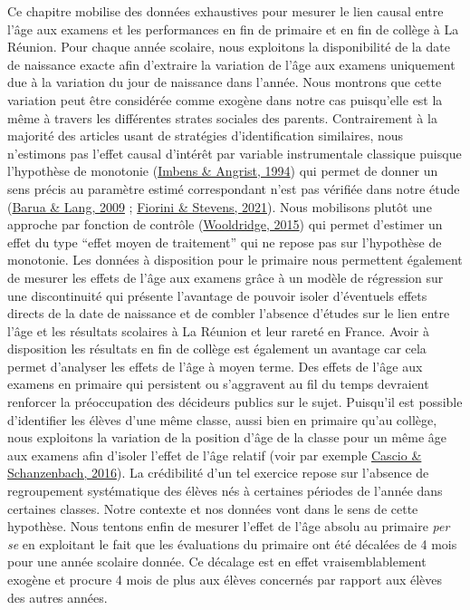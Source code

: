 \documentclass[
]{book}
\begin{document}
\quad Ce chapitre mobilise des données exhaustives pour mesurer le lien causal entre l'âge aux examens et les performances en fin de primaire et en fin de collège à La Réunion. Pour chaque année scolaire, nous exploitons la disponibilité de la date de naissance exacte afin d'extraire la variation de l'âge aux examens uniquement due à la variation du jour de naissance dans l'année. Nous montrons que cette variation peut être considérée comme exogène dans notre cas puisqu'elle est la même à travers les différentes strates sociales des parents. Contrairement à la majorité des articles usant de stratégies d'identification similaires, nous n'estimons pas l'effet causal d'intérêt par variable instrumentale classique puisque l'hypothèse de monotonie (\protect\hyperlink{ref-IMB:ANG:94}{Imbens \& Angrist, 1994}) qui permet de donner un sens précis au paramètre estimé correspondant n'est pas vérifiée dans notre étude (\protect\hyperlink{ref-BAR:LAN:09}{Barua \& Lang, 2009} ; \protect\hyperlink{ref-FIO:STE:21}{Fiorini \& Stevens, 2021}). Nous mobilisons plutôt une approche par fonction de contrôle (\protect\hyperlink{ref-WOO:15}{Wooldridge, 2015}) qui permet d'estimer un effet du type ``effet moyen de traitement'' qui ne repose pas sur l'hypothèse de monotonie. Les données à disposition pour le primaire nous permettent également de mesurer les effets de l'âge aux examens grâce à un modèle de régression sur une discontinuité qui présente l'avantage de pouvoir isoler d'éventuels effets directs de la date de naissance et de combler l'absence d'études sur le lien entre l'âge et les résultats scolaires à La Réunion et leur rareté en France. Avoir à disposition les résultats en fin de collège est également un avantage car cela permet d'analyser les effets de l'âge à moyen terme. Des effets de l'âge aux examens en primaire qui persistent ou s'aggravent au fil du temps devraient renforcer la préoccupation des décideurs publics sur le sujet. Puisqu'il est possible d'identifier les élèves d'une même classe, aussi bien en primaire qu'au collège, nous exploitons la variation de la position d'âge de la classe pour un même âge aux examens afin d'isoler l'effet de l'âge relatif (voir par exemple \protect\hyperlink{ref-CAS:SCH:16}{Cascio \& Schanzenbach, 2016}). La crédibilité d'un tel exercice repose sur l'absence de regroupement systématique des élèves nés à certaines périodes de l'année dans certaines classes. Notre contexte et nos données vont dans le sens de cette hypothèse. Nous tentons enfin de mesurer l'effet de l'âge absolu au primaire \emph{per se} en exploitant le fait que les évaluations du primaire ont été décalées de 4 mois pour une année scolaire donnée. Ce décalage est en effet vraisemblablement exogène et procure 4 mois de plus aux élèves concernés par rapport aux élèves des autres années.
\end{document}
